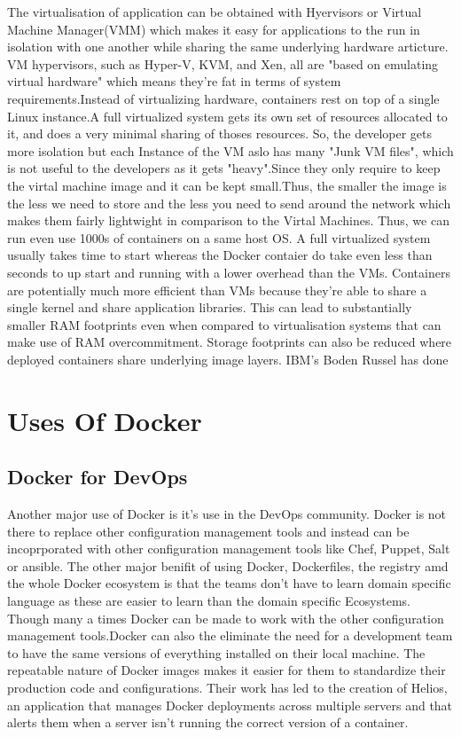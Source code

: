 \documentclass[9pt,twocolumn,twoside]{styles/osajnl}
\begin{document}
The virtualisation of application can be obtained with Hyervisors or
Virtual Machine Manager(VMM) which makes it easy for applications to
the run in isolation with one another while sharing the same
underlying hardware articture. VM hypervisors, such as Hyper-V, KVM,
and Xen, all are "based on emulating virtual hardware" which means
they’re fat in terms of system requirements.Instead of virtualizing
hardware, containers rest on top of a single Linux instance.A full
virtualized system gets its own set of resources allocated to it, and
does a very minimal sharing of thoses resources. So, the developer
gets more isolation but each Instance of the VM aslo has many "Junk VM
files", which is not useful to the developers as it gets "heavy".Since
they only require to keep the virtal machine image and it can be kept
small.Thus, the smaller the image is the less we need to store and the
less you need to send around the network which makes them fairly
lightwight in comparison to the Virtal Machines. Thus, we can run even
use 1000s of containers on a same host OS.
\cite{www-stackoverflow-docker}A full virtualized system usually
takes time to start whereas the Docker contaier do take even less than
seconds to up start and running with a lower overhead than the VMs.
Containers are potentially much more efficient than VMs because
they’re able to share a single kernel and share application libraries.
This can lead to substantially smaller RAM footprints even when
compared to virtualisation systems that can make use of RAM
overcommitment.  Storage footprints can also be reduced where deployed
containers share underlying image layers. IBM’s Boden Russel has done


\section{Uses Of Docker}

\subsection{Docker for DevOps}
Another major use of Docker is it's use in the DevOps community. Docker 
is not there to replace other configuration management tools and instead 
can be incoprporated with other configuration management tools like 
Chef, Puppet, Salt or ansible. The other major benifit of using 
Docker, Dockerfiles, the registry amd the whole Docker ecosystem is that 
the teams don't have to learn domain specific language as these are 
easier to learn than the domain specific Ecosystems. Though many a times 
Docker can be made to work with the other configuration management 
tools.\cite{www-docker-1}Docker can also the eliminate the need for a 
development team to have the same versions of everything installed on 
their local machine. The repeatable nature of Docker images makes it 
easier for them to standardize their production code and configurations.
Their work has led to the creation of Helios, an application that manages
Docker deployments across multiple servers and that alerts them when a
server isn't running the correct version of a container.
\end{document}

